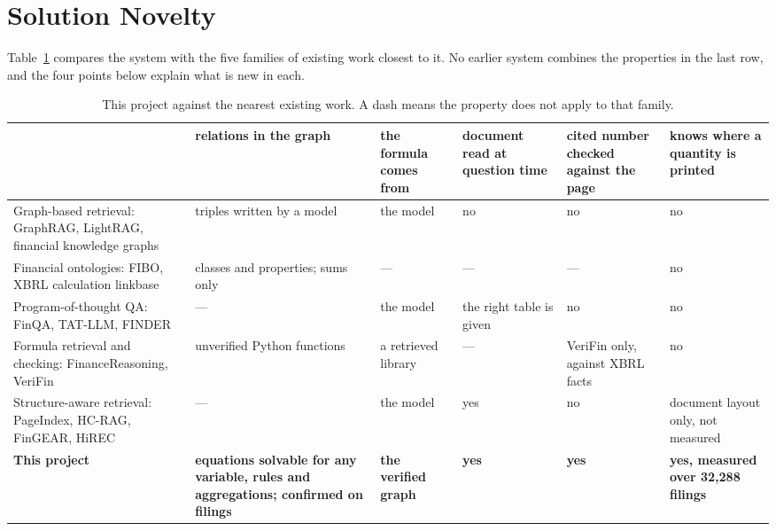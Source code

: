 \section{Solution Novelty}
\label{sec:novelty}

Table~\ref{tab:compare} compares the system with the five families of existing work closest to it. No earlier system combines the properties in the last row, and the four points below explain what is new in each.

\begin{table}[h]
\centering\footnotesize
\caption{This project against the nearest existing work. A dash means the property does not apply to that family.}
\label{tab:compare}
\setlength{\tabcolsep}{4pt}\begin{tabular}{@{}>{\raggedright\arraybackslash}p{44mm}>{\raggedright\arraybackslash}p{27mm}>{\raggedright\arraybackslash}p{22mm}>{\raggedright\arraybackslash}p{19mm}>{\raggedright\arraybackslash}p{22mm}>{\raggedright\arraybackslash}p{24mm}@{}}
\toprule
 & relations in the graph & the formula comes from & document read at question time & cited number checked against the page & knows where a quantity is printed \\
\midrule
Graph-based retrieval: GraphRAG, LightRAG, financial knowledge graphs~\citep{edge2024graphrag,guo2024lightrag,shah2024multidoc,arun2025finreflectkg} & triples written by a model & the model & no & no & no \\
Financial ontologies: FIBO, XBRL calculation linkbase~\citep{bennett2013fibo,xbrl2003spec} & classes and properties; sums only & --- & --- & --- & no \\
Program-of-thought QA: FinQA, TAT-LLM, FINDER~\citep{chen2021finqa,zhu2024tatllm,khatuya2025finder} & --- & the model & the right table is given & no & no \\
Formula retrieval and checking: FinanceReasoning, VeriFin~\citep{tang2025financereasoning,hall2026verifin} & unverified Python functions & a retrieved library & --- & VeriFin only, against XBRL facts & no \\
Structure-aware retrieval: PageIndex, HC-RAG, FinGEAR, HiREC~\citep{vectify2026mafin,chen2026hcrag,li2025fingear,choe2025hirec} & --- & the model & yes & no & document layout only, not measured \\
\midrule
\textbf{This project} & \textbf{equations solvable for any variable, rules and aggregations; confirmed on filings} & \textbf{the verified graph} & \textbf{yes} & \textbf{yes} & \textbf{yes, measured over 32,288 filings} \\
\bottomrule
\end{tabular}
\end{table}

